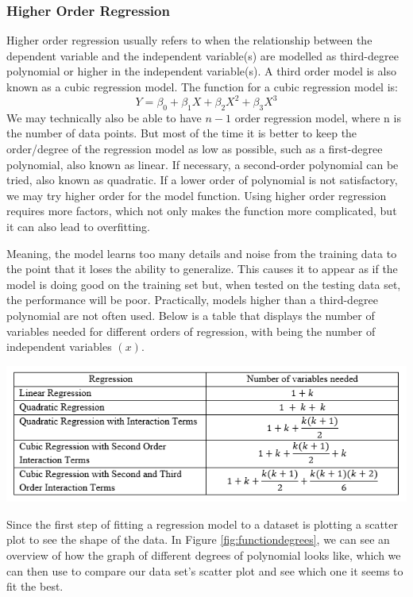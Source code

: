 \documentclass[a4paper,12pt]{report}
\begin{document}
\subsubsection{Higher Order Regression}
Higher order regression usually refers to when the relationship between the dependent variable and the independent variable(s) are modelled as third-degree polynomial or higher in the independent variable(s). A third order model is also known as a cubic regression model. The function for a cubic regression model is:
$$Y=\beta_0+\beta_1X+\beta_2X^2+\beta_3X^3$$
We may technically also be able to have $n - 1$ order regression model, where n is the number of data points. But most of the time it is better to keep the order/degree of the regression model as low as possible, such as a first-degree polynomial, also known as linear. If necessary, a second-order polynomial can be tried, also known as quadratic. If a lower order of polynomial is not satisfactory, we may try higher order for the model function. Using higher order regression requires more factors, which not only makes the function more complicated, but it can also lead to overfitting.

Meaning, the model learns too many details and noise from the training data to the point that it loses the ability to generalize. This causes it to appear as if the model is doing good on the training set but, when tested on the testing data set, the performance will be poor. Practically, models higher than a third-degree polynomial are not often used. Below is a table that displays the number of variables needed for different orders of regression, with  being the number of independent variables $(x)$.

\begin{center}
    \captionsetup{type=figure}
    \includegraphics[width=.9\linewidth]{media/regressionformulasvars.png}
\end{center}

Since the first step of fitting a regression model to a dataset is plotting a scatter plot to see the shape of the data. In Figure \ref{fig:functiondegrees}, we can see an overview of how the graph of different degrees of polynomial looks like, which we can then use to compare our data set’s scatter plot and see which one it seems to fit the best. 
\end{document}

